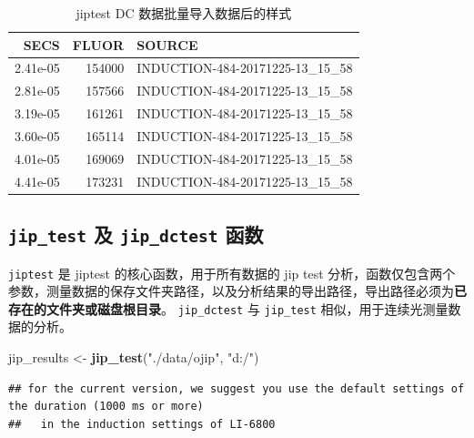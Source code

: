 \documentclass[]{krantz}
\makeatletter
\newenvironment{Shaded}{\begin{snugshade}}{\end{snugshade}}
\newcommand{\KeywordTok}[1]{\textcolor[rgb]{0.13,0.29,0.53}{\textbf{#1}}}
\newcommand{\StringTok}[1]{\textcolor[rgb]{0.31,0.60,0.02}{#1}}
\newcommand{\NormalTok}[1]{#1}
\newenvironment{kframe}{%
\medskip{}
\setlength{\fboxsep}{.8em}
 \def\at@end@of@kframe{}%
 \ifinner\ifhmode%
  \def\at@end@of@kframe{\end{minipage}}%
  \begin{minipage}{\columnwidth}%
 \fi\fi%
 \def\FrameCommand##1{\hskip\@totalleftmargin \hskip-\fboxsep
 \colorbox{shadecolor}{##1}\hskip-\fboxsep
     \hskip-\linewidth \hskip-\@totalleftmargin \hskip\columnwidth}%
 \MakeFramed {\advance\hsize-\width
   \@totalleftmargin\z@ \linewidth\hsize
   \@setminipage}}%
 {\par\unskip\endMakeFramed%
 \at@end@of@kframe}
\renewenvironment{Shaded}{\begin{kframe}}{\end{kframe}}
\theoremstyle{definition}
\theoremstyle{definition}
\theoremstyle{definition}
\theoremstyle{remark}
\makeatother
\begin{document}
\begin{table}[t]

\caption{\label{tab:unnamed-chunk-26}jiptest DC 数据批量导入数据后的样式}
\centering
\begin{tabular}{rrl}
\toprule
SECS & FLUOR & SOURCE\\
\midrule
2.41e-05 & 154000 & INDUCTION-484-20171225-13\_15\_58\\
2.81e-05 & 157566 & INDUCTION-484-20171225-13\_15\_58\\
3.19e-05 & 161261 & INDUCTION-484-20171225-13\_15\_58\\
3.60e-05 & 165114 & INDUCTION-484-20171225-13\_15\_58\\
4.01e-05 & 169069 & INDUCTION-484-20171225-13\_15\_58\\
\addlinespace
4.41e-05 & 173231 & INDUCTION-484-20171225-13\_15\_58\\
\bottomrule
\end{tabular}
\end{table}

\subsection{\texorpdfstring{\texttt{jip\_test} 及 \texttt{jip\_dctest}
函数}{jip\_test 及 jip\_dctest 函数}}\label{jip_test--jip_dctest-}

\texttt{jiptest} 是 jiptest 的核心函数，用于所有数据的 jip test
分析，函数仅包含两个参数，测量数据的保存文件夹路径，以及分析结果的导出路径，导出路径必须为\textbf{已存在的文件夹或磁盘根目录}。
\texttt{jip\_dctest} 与 \texttt{jip\_test}
相似，用于连续光测量数据的分析。

\begin{Shaded}
\begin{Highlighting}[]
\NormalTok{jip_results <-}\StringTok{ }\KeywordTok{jip_test}\NormalTok{(}\StringTok{"./data/ojip"}\NormalTok{, }\StringTok{"d:/"}\NormalTok{)}
\end{Highlighting}
\end{Shaded}

\begin{verbatim}
## for the current version, we suggest you use the default settings of the duration (1000 ms or more)
##   in the induction settings of LI-6800
\end{verbatim}
\end{document}
